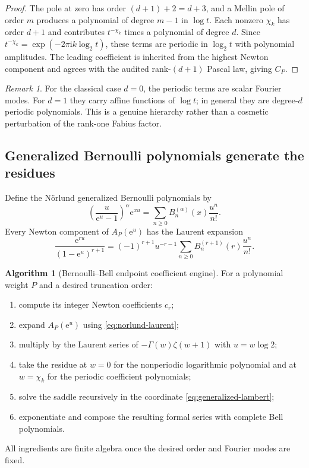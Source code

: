 \documentclass[11pt,oneside]{article}
\numberwithin{equation}{section}
\theoremstyle{definition}
\newtheorem{algorithm}[theorem]{Algorithm}
\theoremstyle{remark}
\newtheorem{remark}[theorem]{Remark}
\newcommand{\e}{\mathrm e}
\newcommand{\ii}{\mathrm i}
\begin{document}
\begin{proof}
The pole at zero has order $(d+1)+2=d+3$, and a Mellin pole of order $m$ produces a
polynomial of degree $m-1$ in $\log t$.  Each nonzero $\chi_k$ has order $d+1$ and contributes
$t^{-\chi_k}$ times a polynomial of degree $d$.  Since
$t^{-\chi_k}=\exp(-2\pi\ii k\log_2t)$, these terms are periodic in $\log_2t$ with polynomial
amplitudes.  The leading coefficient is inherited from the highest Newton component and
agrees with the audited rank-$(d+1)$ Pascal law, giving $C_P$.
\end{proof}

\begin{remark}
For the classical case $d=0$, the periodic terms are scalar Fourier modes.  For $d=1$ they
carry affine functions of $\log t$; in general they are degree-$d$ periodic polynomials.
This is a genuine hierarchy rather than a cosmetic perturbation of the rank-one Fabius
factor.
\end{remark}

\subsection{Generalized Bernoulli polynomials generate the residues}

Define the N\"orlund generalized Bernoulli polynomials \cite{norlund1924} by
\begin{equation}
 \left(\frac u{\e^u-1}\right)^\alpha\e^{xu}
 =\sum_{n\ge0}B_n^{(\alpha)}(x)\frac{u^n}{n!}.
 \label{eq:norlund-def}
\end{equation}
Every Newton component of $A_P(\e^u)$ has the Laurent expansion
\begin{equation}
 \boxed{
 \frac{\e^{ru}}{(1-\e^u)^{r+1}}
 =(-1)^{r+1}u^{-r-1}
  \sum_{n\ge0}B_n^{(r+1)}(r)\frac{u^n}{n!}.}
 \label{eq:norlund-laurent}
\end{equation}

\begin{algorithm}[Bernoulli--Bell endpoint coefficient engine]
\label{alg:bernoulli-bell}
For a polynomial weight $P$ and a desired truncation order:
\begin{enumerate}
\item compute its integer Newton coefficients $c_r$;
\item expand $A_P(\e^u)$ using \eqref{eq:norlund-laurent};
\item multiply by the Laurent series of $-\Gamma(w)\zeta(w+1)$ with $u=w\log2$;
\item take the residue at $w=0$ for the nonperiodic logarithmic polynomial and at
      $w=\chi_k$ for the periodic coefficient polynomials;
\item solve the saddle recursively in the coordinate \eqref{eq:generalized-lambert};
\item exponentiate and compose the resulting formal series with complete Bell polynomials.
\end{enumerate}
All ingredients are finite algebra once the desired order and Fourier modes are fixed.
\end{algorithm}
\end{document}
